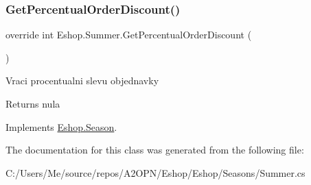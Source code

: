 \mbox{\label{class_eshop_1_1_summer_a3b3b71b9a83e117fb3b5a2a7e3da3a1a}} 
\subsubsection{\texorpdfstring{GetPercentualOrderDiscount()}{GetPercentualOrderDiscount()}}
{\footnotesize\ttfamily override int Eshop.\+Summer.\+Get\+Percentual\+Order\+Discount (\begin{DoxyParamCaption}{ }\end{DoxyParamCaption})\hspace{0.3cm}{\ttfamily [virtual]}}



Vraci procentualni slevu objednavky 

\begin{DoxyReturn}{Returns}
nula
\end{DoxyReturn}


Implements \mbox{\hyperlink{class_eshop_1_1_season}{Eshop.\+Season}}.



The documentation for this class was generated from the following file\+:\begin{DoxyCompactItemize}
\item 
C\+:/\+Users/\+Me/source/repos/\+A2\+O\+P\+N/\+Eshop/\+Eshop/\+Seasons/Summer.\+cs\end{DoxyCompactItemize}
